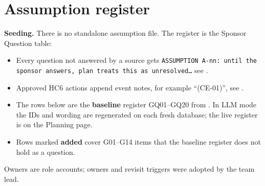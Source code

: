 \chapter{Assumption register}
\label{app:assumptions}

\textbf{Seeding.} There is no standalone assumption file. The register is the Sponsor Question table:

\begin{itemize}[leftmargin=*,itemsep=2pt]
  \item Every question not answered by a source gets \texttt{ASSUMPTION A-nn: until the sponsor answers, plan treats this as unresolved\ldots} see .
  \item Approved HC6 actions append event notes, for example ``(CE-01)'', see .
  \item The rows below are the \textbf{baseline} register GQ01--GQ20 from . In LLM mode the IDs and wording are regenerated on each fresh database; the live register is on the Planning page.
  \item Rows marked \textbf{added} cover G01--G14 items that the baseline register does not hold as a question.
\end{itemize}

Owners are role accounts; owners and revisit triggers were adopted by the team lead.

